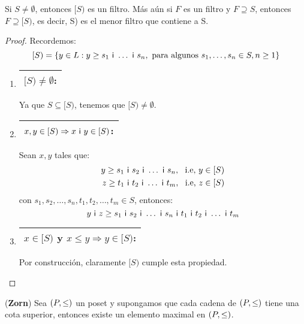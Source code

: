   \begin{lemma} \label{lemma_22}
    \PN Si $S \neq \emptyset$, entonces $[S)$ es un filtro. Más aún si $F$ es un filtro y $F \supseteq S$, entonces $F
    \supseteq \lbrack S)$, es decir, \lbrack S) es el menor filtro que contiene a S.
  \end{lemma}
  \begin{proof}
    \PN Recordemos:
    \[
      [S) = \{y \in L: y \geq s_{1} \ \mathsf{i} \ \dotsc \ \mathsf{i} \ s_{n}, \text{ para algunos } s_{1}, \dotsc, s_{n} \in S,
      n \geq 1\}
    \]

    \begin{enumerate}
      \item \begin{tabular}{|c|} \hline $[S) \neq \emptyset$: \\\hline \end{tabular} Ya que $S \subseteq \lbrack S)$,
        tenemos que $[S) \neq \emptyset$.
      \item \begin{tabular}{|c|} \hline $x, y \in [S) \Rightarrow x \ \mathsf{i} \ y \in [S)$: \\\hline \end{tabular} Sean $x,
        y$ tales que:
        \begin{eqnarray*}
          y \geq s_{1} \ \IN \ s_{2} \ \IN \ \dotsc \ \IN \ s_{n}, \ \text{ i.e, } y \in [S) \\
          z \geq t_{1} \ \IN \ t_{2} \ \IN \ \dotsc \ \IN \ t_{m}, \ \text{ i.e, } z \in [S)
        \end{eqnarray*}
        \PN con $s_{1}, s_{2}, \dotsc, s_{n}, t_{1}, t_{2}, \dotsc, t_{m} \in S$, entonces:
        \[
          y \ \IN \ z \geq s_{1} \ \IN \ s_{2} \ \IN \ \dotsc \ \IN \  s_{n} \ \IN \ t_{1} \ \IN \ t_{2} \ \IN \ \dotsc
          \ \IN \ t_{m}
        \]
      \item \begin{tabular}{|c|} \hline $x \in [S)$ y $x \leq y \Rightarrow y \in [S)$: \\\hline \end{tabular} Por
        construcción, claramente $[S)$ cumple esta propiedad.
    \end{enumerate}
  \end{proof}

  \begin{lemma} \label{lemma_23}
    \PN (\textbf{Zorn}) Sea $(P, \leq)$ un poset y supongamos que cada cadena de $(P, \leq)$ tiene una cota superior, entonces
    existe un elemento maximal en $(P, \leq)$.
  \end{lemma}

